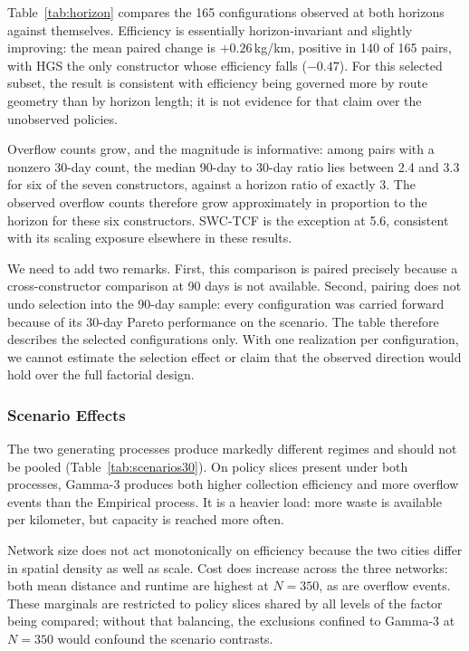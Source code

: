 \documentclass[orivec,runningheads]{llncs}
\begin{document}
Table~\ref{tab:horizon} compares the 165 configurations observed at both
horizons against themselves. Efficiency is essentially horizon-invariant and
slightly improving: the mean paired change is $+0.26$\,kg/km, positive in 140 of
165 pairs, with HGS the only constructor whose efficiency falls ($-0.47$). For
this selected subset, the result is consistent with efficiency being governed
more by route geometry than by horizon length; it is not evidence for that claim
over the unobserved policies.

Overflow counts grow, and the magnitude is informative: among pairs with a
nonzero 30-day count, the median 90-day to 30-day ratio lies between 2.4 and 3.3
for six of the seven constructors, against a horizon ratio of exactly 3.
The observed overflow counts therefore grow approximately in proportion to the
horizon for these six constructors. SWC-TCF is the exception at 5.6, consistent
with its scaling exposure elsewhere in these results.

We need to add two remarks. First, this comparison is paired precisely because a
cross-constructor comparison at 90 days is not available. Second, pairing does
not undo selection into the 90-day sample: every configuration was carried
forward because of its 30-day Pareto performance on the scenario. The table therefore describes
the selected configurations only. With one realization per configuration, we
cannot estimate the selection effect or claim that the observed direction would
hold over the full factorial design.



\subsubsection{Scenario Effects}

The two generating processes produce markedly different regimes and should not
be pooled (Table~\ref{tab:scenarios30}). On policy slices present under both
processes, Gamma-3 produces both higher collection efficiency and more overflow
events than the Empirical process. It is a heavier load: more waste is available
per kilometer, but capacity is reached more often.

Network size does not act monotonically on efficiency because the two cities
differ in spatial density as well as scale. Cost does increase across the three
networks: both mean distance and runtime are highest at $N=350$, as are overflow
events. These marginals are restricted to policy slices shared by all levels of
the factor being compared; without that balancing, the exclusions confined to
Gamma-3 at $N=350$ would confound the scenario contrasts.
\end{document}
